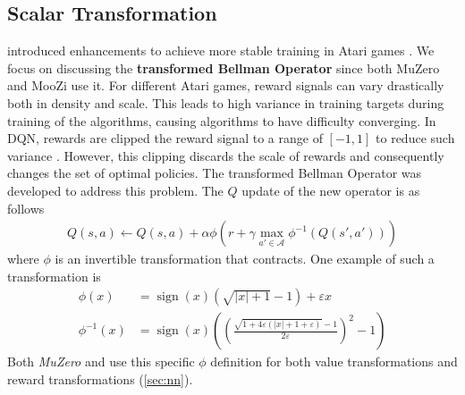 \subsection{Scalar Transformation} \label{sec:scalar_transform}
\citeauthor{ObserveLookFurther_Pohlen.Piot.ea_2018} introduced enhancements to achieve more stable training in Atari games \cite{ObserveLookFurther_Pohlen.Piot.ea_2018}.
We focus on discussing the \textbf{transformed Bellman Operator} since both MuZero and MooZi use it.
For different Atari games, reward signals can vary drastically both in density and scale.
This leads to high variance in training targets during training of the algorithms, causing algorithms to have difficulty converging.
In DQN, rewards are clipped the reward signal to a range of $[-1, 1]$ to reduce such variance \cite{PlayingAtariDeep_Mnih.Kavukcuoglu.ea_2013}.
However, this clipping discards the scale of rewards and consequently changes the set of optimal policies.
The transformed Bellman Operator was developed to address this problem.
The $Q$ update of the new operator is as follows
\begin{align*}
    Q(s, a) \leftarrow Q(s, a) + \alpha \phi \left(r +\gamma \max _{a' \in \mathcal{A}} \phi^{-1}\left(Q\left(s', a'\right)\right)\right)
\end{align*}
where $\phi$ is an invertible transformation that contracts.
One example of such a transformation is
\begin{align*}
    \phi(x)       & = \operatorname{sign}(x)\left(\sqrt{|x|+1}-1\right)+\varepsilon x  \\
    \phi^{-1}(x)  & = \operatorname{sign}(x)\left(\left(\frac{\sqrt{1+4 \varepsilon(|x|+1+\varepsilon)}-1}{2 \varepsilon}\right)^{2}-1\right)
\end{align*}
Both \textit{MuZero} and \moozi use this specific $\phi$ definition for both value transformations and reward transformations (\ref{sec:nn}).


